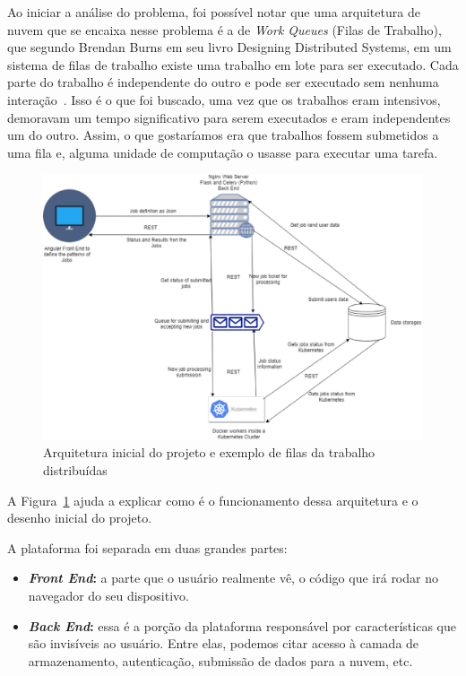 \documentclass[11pt,twoside]{article}
\begin{document}
Ao iniciar a análise do problema, foi possível notar que uma arquitetura de nuvem que se encaixa nesse problema é a de \emph{Work Queues} (Filas de Trabalho), que segundo Brendan Burns em seu livro
Designing Distributed Systems, em um sistema de filas de trabalho existe uma trabalho em lote para ser executado. Cada parte do trabalho é independente do outro e pode ser executado sem nenhuma interação~\cite{BB}.
Isso é o que foi buscado, uma vez que os trabalhos eram intensivos, demoravam um tempo significativo para serem executados e eram independentes um do outro. Assim, o que gostaríamos era que trabalhos fossem submetidos
a uma fila e, alguma unidade de computação o usasse para executar uma tarefa.

\begin{figure}[!h]
  \centering
  \includegraphics[scale=0.4]{arch.eps}
  \caption{Arquitetura inicial do projeto e exemplo de filas da trabalho distribuídas}
  \label{fig:archtec}
\end{figure}

A Figura~\ref{fig:archtec} ajuda a explicar como é o funcionamento dessa arquitetura e o desenho inicial do projeto.

A plataforma foi separada em duas grandes partes:

\begin{itemize}
  \item \textbf{\emph{Front End}:} a parte que o usuário realmente vê, o código que irá rodar no navegador do seu dispositivo. 
  \item \textbf{\emph{Back End}:} essa é a porção da plataforma responsável por características que são invisíveis ao usuário. Entre elas, podemos citar acesso à camada de armazenamento, autenticação,
  submissão de dados para a nuvem, etc.
\end{itemize}
\end{document}
